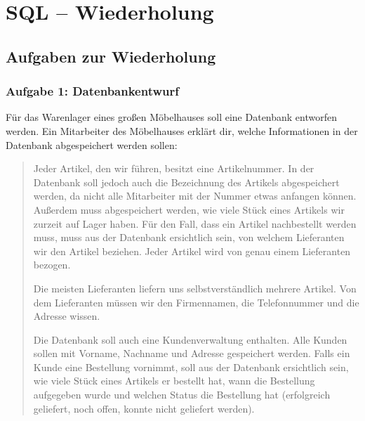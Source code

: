 \chapter{SQL -- Wiederholung \tagZusatz \tagLK}
\renewcommand{\chaptertitle}{SQL -- Wiederholung}

\lehead[]{\normalfont\sffamily\hspace*{-2.00cm}\textcolor{white}{\colorbox{lightblue}{\makebox[1.60cm][r]{\thechapter}}}\hspace{0.17cm}\textcolor{lightblue}{\chaptertitle}}
\rohead[]{\textcolor{lightblue}{\chaptertitle}\normalfont\sffamily\hspace*{0.17cm}\textcolor{white}{\colorbox{lightblue}{\makebox[1.60cm][l]{\thechapter}}}\hspace{-2.00cm}}
\rehead[]{\textcolor{lightblue}{AvHG, Inf, My}}
\lohead[]{\textcolor{lightblue}{AvHG, Inf, My}}

\section{Aufgaben zur Wiederholung}

\subsection{Aufgabe 1: Datenbankentwurf}

Für das Warenlager eines großen Möbelhauses soll eine Datenbank entworfen
werden. Ein Mitarbeiter des Möbelhauses erklärt dir, welche Informationen in der
Datenbank abgespeichert werden sollen:

\begin{quotation}
\noindent Jeder Artikel, den wir führen, besitzt eine Artikelnummer. In der
Datenbank soll jedoch auch die Bezeichnung des Artikels abgespeichert werden,
da nicht alle Mitarbeiter mit der Nummer etwas anfangen können. Außerdem muss
abgespeichert werden, wie viele Stück eines Artikels wir zurzeit auf Lager
haben. Für den Fall, dass ein Artikel nachbestellt werden muss, muss aus der
Datenbank ersichtlich sein, von welchem Lieferanten wir den Artikel beziehen.
Jeder Artikel wird von genau einem Lieferanten bezogen.

\noindent Die meisten Lieferanten liefern uns selbstverständlich mehrere
Artikel. Von dem Lieferanten müssen wir den Firmennamen, die Telefonnummer und
die Adresse wissen.

\noindent Die Datenbank soll auch eine Kundenverwaltung enthalten. Alle Kunden
sollen mit Vorname, Nachname und Adresse gespeichert werden. Falls ein Kunde eine
Bestellung vornimmt, soll aus der Datenbank ersichtlich sein, wie viele Stück
eines Artikels er bestellt hat, wann die Bestellung aufgegeben wurde und welchen
Status die Bestellung hat (erfolgreich geliefert, noch offen, konnte nicht
geliefert werden).
\end{quotation}

